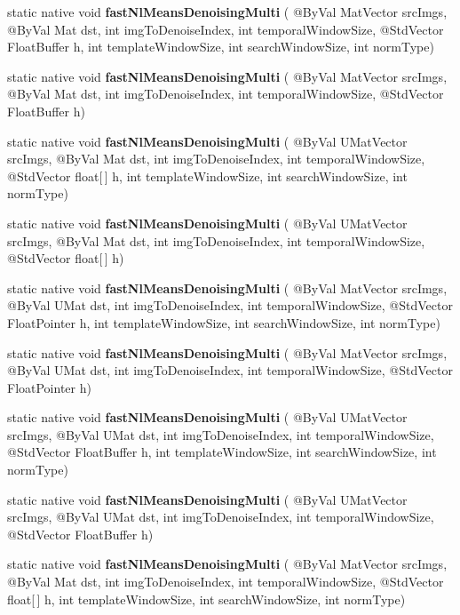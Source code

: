 \begin{DoxyCompactItemize}
\item 
static native void {\bfseries fast\+Nl\+Means\+Denoising\+Multi} ( @By\+Val Mat\+Vector src\+Imgs, @By\+Val Mat dst, int img\+To\+Denoise\+Index, int temporal\+Window\+Size, @Std\+Vector Float\+Buffer h, int template\+Window\+Size, int search\+Window\+Size, int norm\+Type)
\item 
static native void {\bfseries fast\+Nl\+Means\+Denoising\+Multi} ( @By\+Val Mat\+Vector src\+Imgs, @By\+Val Mat dst, int img\+To\+Denoise\+Index, int temporal\+Window\+Size, @Std\+Vector Float\+Buffer h)
\item 
static native void {\bfseries fast\+Nl\+Means\+Denoising\+Multi} ( @By\+Val U\+Mat\+Vector src\+Imgs, @By\+Val Mat dst, int img\+To\+Denoise\+Index, int temporal\+Window\+Size, @Std\+Vector float\mbox{[}$\,$\mbox{]} h, int template\+Window\+Size, int search\+Window\+Size, int norm\+Type)
\item 
static native void {\bfseries fast\+Nl\+Means\+Denoising\+Multi} ( @By\+Val U\+Mat\+Vector src\+Imgs, @By\+Val Mat dst, int img\+To\+Denoise\+Index, int temporal\+Window\+Size, @Std\+Vector float\mbox{[}$\,$\mbox{]} h)
\item 
static native void {\bfseries fast\+Nl\+Means\+Denoising\+Multi} ( @By\+Val Mat\+Vector src\+Imgs, @By\+Val U\+Mat dst, int img\+To\+Denoise\+Index, int temporal\+Window\+Size, @Std\+Vector Float\+Pointer h, int template\+Window\+Size, int search\+Window\+Size, int norm\+Type)
\item 
static native void {\bfseries fast\+Nl\+Means\+Denoising\+Multi} ( @By\+Val Mat\+Vector src\+Imgs, @By\+Val U\+Mat dst, int img\+To\+Denoise\+Index, int temporal\+Window\+Size, @Std\+Vector Float\+Pointer h)
\item 
static native void {\bfseries fast\+Nl\+Means\+Denoising\+Multi} ( @By\+Val U\+Mat\+Vector src\+Imgs, @By\+Val U\+Mat dst, int img\+To\+Denoise\+Index, int temporal\+Window\+Size, @Std\+Vector Float\+Buffer h, int template\+Window\+Size, int search\+Window\+Size, int norm\+Type)
\item 
static native void {\bfseries fast\+Nl\+Means\+Denoising\+Multi} ( @By\+Val U\+Mat\+Vector src\+Imgs, @By\+Val U\+Mat dst, int img\+To\+Denoise\+Index, int temporal\+Window\+Size, @Std\+Vector Float\+Buffer h)
\item 
static native void {\bfseries fast\+Nl\+Means\+Denoising\+Multi} ( @By\+Val Mat\+Vector src\+Imgs, @By\+Val Mat dst, int img\+To\+Denoise\+Index, int temporal\+Window\+Size, @Std\+Vector float\mbox{[}$\,$\mbox{]} h, int template\+Window\+Size, int search\+Window\+Size, int norm\+Type)

\end{DoxyCompactItemize}
